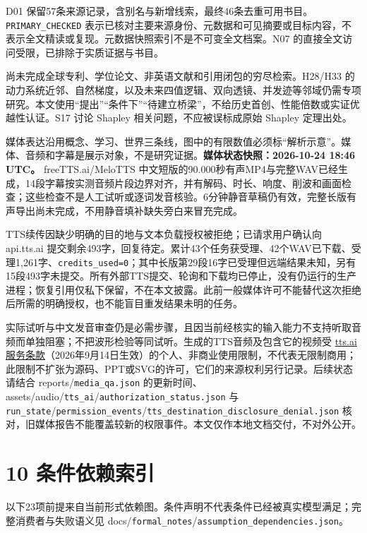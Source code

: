 \documentclass[
  10pt,
]{article}
\begin{document}
D01
保留57条来源记录，含别名与新增线索，最终46条去重可用书目。\nolinkurl{PRIMARY_CHECKED}
表示已核对主要来源身份、元数据和可见摘要或目标内容，不表示全文精读或复现。元数据快照索引不是不可变全文档案。N07
的直接全文访问受限，已排除于实质证据与书目。

尚未完成全球专利、学位论文、非英语文献和引用闭包的穷尽检索。H28/H33
的动力系统近邻、自然梯度，以及未来四值逻辑、双向透镜、并发迹等邻域仍需专项研究。本文使用``提出''``条件下''``待建立桥梁''，不给历史首创、性能倍数或实证优越性认证。S17
讨论 Shapley 相关问题，不应被误标成原始 Shapley 定理出处。

媒体表达沿用概念、学习、世界三条线，图中的有限数值必须标``解析示意''。媒体、音频和字幕是展示对象，不是研究证据。\textbf{媒体状态快照：2026-10-24
18:46 UTC。} freeTTS.ai/MeloTTS
中文短版的90.000秒有声MP4与完整WAV已经生成，14段字幕按实测音频片段边界对齐，并有解码、时长、响度、削波和画面检查；这些检查不是人工试听或逐词发音核验。6分钟静音草稿仍有效，完整长版有声导出尚未完成，不用静音填补缺失旁白来冒充完成。

TTS续传因缺少明确的目的地与文本负载授权被拒绝；已请求用户确认向
api.tts.ai
提交剩余493字，回复待定。累计43个任务获受理、42个WAV已下载、受理1,261字、\nolinkurl{credits_used=0}；其中长版第29段16字已受理但远端结果未知，另有15段493字未提交。所有外部TTS提交、轮询和下载均已停止，没有仍运行的生产进程；恢复引用仅私下保留，不在本文披露。此前一般媒体许可不能替代这次拒绝后所需的明确授权，也不能盲目重发结果未明的任务。

实际试听与中文发音审查仍是必需步骤，且因当前经核实的输入能力不支持听取音频而单独阻塞；不把波形检验等同试听。生成的TTS音频及包含它的视频受
\href{https://tts.ai/terms/}{tts.ai服务条款}（2026年9月14日生效）的个人、非商业使用限制，不代表无限制商用；此限制不扩张为源码、PPT或SVG的许可，它们的来源权利另行记录。后续状态请结合
reports/\nolinkurl{media_qa.json}
的更新时间、assets/audio/\nolinkurl{tts_ai}/\nolinkurl{authorization_status.json}
与
\nolinkurl{run_state}/\nolinkurl{permission_events}/\nolinkurl{tts_destination_disclosure_denial.json}
核对，旧媒体报告不能覆盖较新的权限事件。本文仅作本地文档交付，不对外公开。

\section{10 条件依赖索引}\label{ux6761ux4ef6ux4f9dux8d56ux7d22ux5f15}

以下23项前提来自当前形式依赖图。条件声明不代表条件已经被真实模型满足；完整消费者与失败语义见
docs/\nolinkurl{formal_notes}/\nolinkurl{assumption_dependencies.json}。
\end{document}
